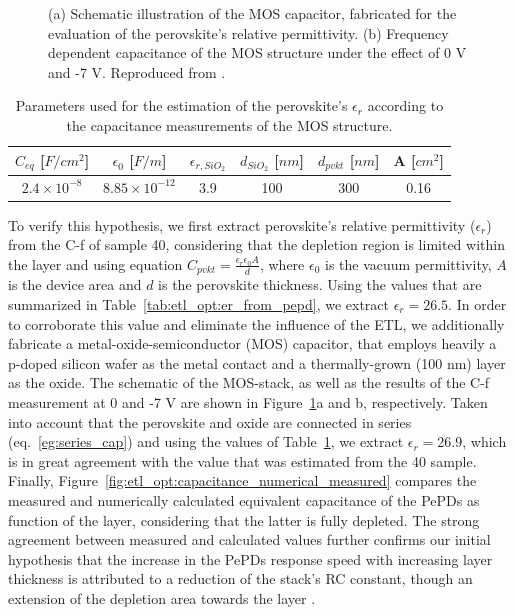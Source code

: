 \begin{figure}[htbp]
    \caption[Schematic illustration of perovskite MOS capacitor and frequency-dependent capacitance results.]{(a) Schematic illustration of the MOS capacitor, fabricated for the evaluation of the perovskite's relative permittivity. (b) Frequency dependent capacitance of the MOS structure under the effect of 0 V and -7 V. Reproduced from \cite{Papadopoulou2025ElectronSpeed}.}
    \label{etl:mos_stack}
\end{figure}


\begin{table}[htbp]
    \centering
    \caption{Parameters used for the estimation of the perovskite’s $\epsilon_r$ according to the capacitance measurements of the MOS structure.}
    \renewcommand{\arraystretch}{1.5}
    \begin{tabular}{| c | c | c | c | c | c |}
        \hline
        $C_{eq}$ [$F/cm^2$] & $\epsilon_0$ [$F/m$] & $\epsilon_{r,SiO_2}$ & $d_{SiO_2}$ [$nm$] & $d_{pvkt}$ [$nm$] & A [$cm^2$] \\
        \hline
        $2.4\times10^{-8}$ & $8.85\times10^{-12}$ & 3.9 & 100 & 300 & 0.16 \\
        \hline
    \end{tabular}
    
    \label{tab:etl_opt:er_from_mos}
\end{table}



To verify this hypothesis, we first extract perovskite's relative permittivity ($\epsilon_r$) from the C-f of sample 40, considering that the depletion region is limited within the  layer and using equation $C_{pvkt} = \frac{\epsilon_r\epsilon_0A}{d}$, where $\epsilon_0$ is the vacuum permittivity, $A$ is the device area and $d$ is the perovskite thickness. Using the values that are summarized in Table~\ref{tab:etl_opt:er_from_pepd}, we extract $\epsilon_r = 26.5$. In order to corroborate this value and eliminate the influence of the ETL, we additionally fabricate a metal-oxide-semiconductor (MOS) capacitor, that employs heavily a p-doped silicon wafer as the metal contact and a thermally-grown  (100 nm) layer as the oxide. The schematic of the MOS-stack, as well as the results of the C-f measurement at 0 and -7 V are shown in Figure~\ref{etl:mos_stack}a and b, respectively. Taken into account that the perovskite and oxide are connected in series (eq.~\ref{eg:series_cap}) and using the values of Table~\ref{tab:etl_opt:er_from_mos}, we extract $\epsilon_r = 26.9$, which is in great agreement with the value that was estimated from the 40 sample. Finally, Figure~\ref{fig:etl_opt:capacitance_numerical_measured} compares the measured and numerically calculated equivalent capacitance of the PePDs as function of the  layer, considering that the latter is fully depleted. The strong agreement between measured and calculated values further confirms our initial hypothesis that the increase in the PePDs response speed with increasing  layer thickness is attributed to a reduction of the stack's RC constant, though an extension of the depletion area towards the  layer \cite{Goushcha2017OnPhotodiodes}. 


